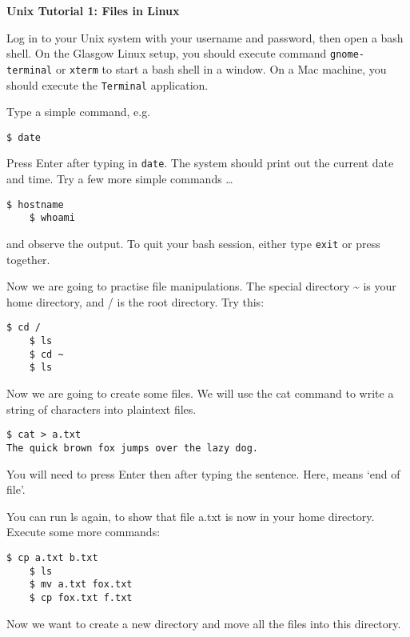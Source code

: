 \documentclass{article}
\begin{document}
\noindent
{\Large \textsf{\textbf{Unix Tutorial 1: Files in Linux}}}

\bigskip


Log in to your Unix system with your username and password, then
open a bash shell. On the Glasgow Linux setup, you should execute command \texttt{gnome-terminal} or \texttt{xterm} to start a bash shell in a window. On a Mac machine, you should execute the \texttt{Terminal} application.

Type a simple command, e.g.\
\begin{lstlisting}[style=BashInputStyle]
    $ date
\end{lstlisting}
Press Enter after typing in \lstinline{date}. The system should print out the current date and time.
Try a few more simple commands \ldots
\begin{lstlisting}[style=BashInputStyle]
    $ hostname
    $ whoami
\end{lstlisting}

and observe the output.
To quit your bash session, either type \lstinline{exit} or press
\keys{\ctrl + D} together.




Now we are going to practise file manipulations. The special directory \~{} is your home directory, and / is the root directory. Try this:


\begin{lstlisting}[style=BashInputStyle]
    $ cd /
    $ ls
    $ cd ~
    $ ls
\end{lstlisting}

Now we are going to create some files. We will use the cat command to write a string of characters into plaintext files.

\begin{lstlisting}[style=BashInputStyle]
    $ cat > a.txt
The quick brown fox jumps over the lazy dog.
\end{lstlisting}

You will need to press Enter then  after typing the sentence. Here,  means `end of file'.

You can run ls again, to show that file a.txt is now in your home directory. Execute some more commands:

\begin{lstlisting}[style=BashInputStyle]
    $ cp a.txt b.txt
    $ ls
    $ mv a.txt fox.txt
    $ cp fox.txt f.txt
\end{lstlisting}

Now we want to create a new directory and move all the files into this directory.
\end{document}
